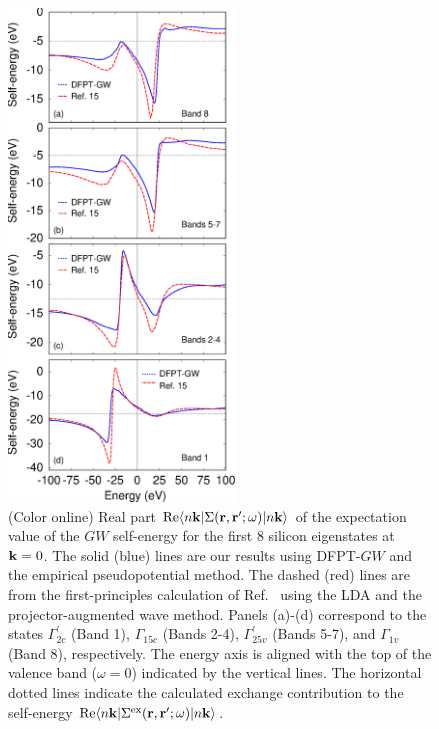 \documentclass[twocolumn,prb,showpacs,superscriptaddress]{revtex4}
\def\w{\omega}
\def\k{{\bf k}}
\def\r{{\bf r}}
\def\rp{{\bf r^\prime}}
\begin{document}
\begin  {figure}
\begin  {center}
\includegraphics[width=6cm]{fig.sigma.eps}
\end    {center}
\caption{\label{fig.sigma}
        (Color online)
        Real part ${\rm Re} \langle n\k| \Sigma(\r,\rp;\w)|n\k\rangle$   of the expectation value of the $GW$ self-energy for the first 
        8 silicon eigenstates at $\k=0$. The solid (blue) lines are our results using DFPT-$GW$ and the empirical
        pseudopotential method. The dashed (red) lines are from the first-principles calculation of Ref.\  
        using the LDA and the projector-augmented wave method. Panels (a)-(d) correspond to the states
        $\Gamma^\prime_{2c}$ (Band 1), $\Gamma_{15c}$ (Bands 2-4), $\Gamma^\prime_{25v}$ (Bands 5-7), 
        and $\Gamma_{1v}$ (Band 8), respectively. The energy axis is aligned with the top of the valence band ($\w=0$) indicated by the vertical lines.
        The horizontal dotted lines indicate the calculated exchange contribution to the self-energy ${\rm Re} \langle n\k| \Sigma^{\rm ex}(\r,\rp;\w)|n\k\rangle$.
        }
\end    {figure}
\end{document}
